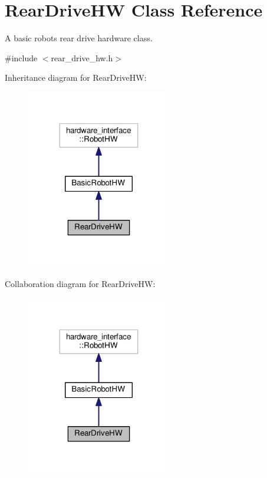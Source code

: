 \hypertarget{classRearDriveHW}{}\section{Rear\+Drive\+HW Class Reference}
\label{classRearDriveHW}


A basic robot\textquotesingle{}s rear drive hardware class.  




{\ttfamily \#include $<$rear\+\_\+drive\+\_\+hw.\+h$>$}



Inheritance diagram for Rear\+Drive\+HW\+:\nopagebreak
\begin{figure}[H]
\begin{center}
\leavevmode
\includegraphics[width=179pt]{classRearDriveHW__inherit__graph}
\end{center}
\end{figure}


Collaboration diagram for Rear\+Drive\+HW\+:\nopagebreak
\begin{figure}[H]
\begin{center}
\leavevmode
\includegraphics[width=179pt]{classRearDriveHW__coll__graph}
\end{center}
\end{figure}
